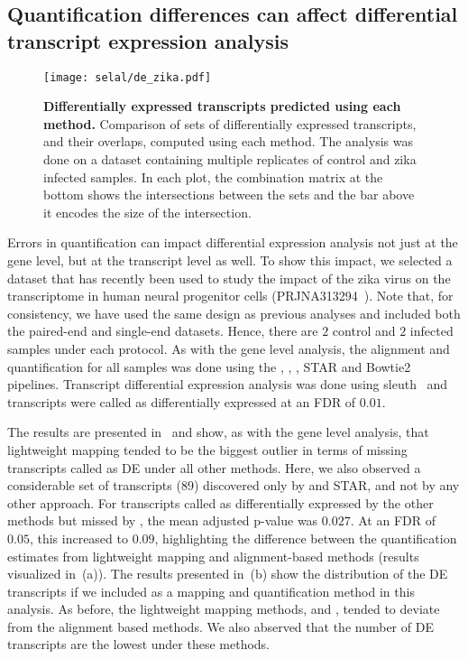 \subsection{Quantification differences can affect differential transcript expression analysis}
\label{sec:DTE}

\begin{figure}[ht!]
	\centering
	\texttt{[image: selal/de\_zika.pdf]}
    \caption{\textbf{Differentially expressed transcripts predicted using each method.} 
    Comparison of sets of differentially expressed transcripts, and their overlaps, computed using each method.
    The analysis was done on a dataset containing multiple replicates of control and zika infected samples.
 	In each plot, the combination matrix at the bottom shows the intersections between the sets and the bar above
      it encodes the size of the intersection.}
    \label{fig:dte}
\end{figure}

Errors in quantification can impact differential expression analysis not just at the gene level, 
but at the transcript level as well. To show this impact, we selected a dataset that has recently been 
used to study the impact of the zika virus on the transcriptome in human neural progenitor cells (PRJNA313294~\citep{tang2016zika}). 
Note that, for consistency, we have used the same design as previous analyses and included both the
paired-end and single-end datasets. Hence, there are $2$ control and $2$ infected samples under
each protocol. As with the gene level analysis, the alignment and quantification for all samples was done using the \hsa, \saf, \qm, 
STAR and Bowtie2 pipelines. Transcript differential expression analysis was done using sleuth~\citep{pimentel2017differential} and 
transcripts were called as differentially expressed at an FDR of $0.01$. 

The results are presented in~ and
show, as with the gene level analysis, that lightweight mapping tended to be the biggest outlier in terms of 
missing transcripts called as DE under all other methods.  Here, we also observed a considerable 
set of transcripts (89) discovered only by \saf and STAR, and not by any other approach. 
For transcripts called as differentially expressed by the other methods but 
missed by \qm, the mean adjusted p-value was $0.027$. At an FDR of $0.05$, this increased to 
$0.09$, highlighting the difference between the quantification estimates from lightweight mapping
and alignment-based methods (results visualized in~(a)). The results presented 
in~(b) show the distribution of the DE transcripts if we included \kallisto as a
mapping and quantification method in this analysis. As before, the lightweight mapping methods, \qm and
\kallisto, tended to deviate from the alignment based methods. We also abserved that the number of DE transcripts
are the lowest under these methods. 

